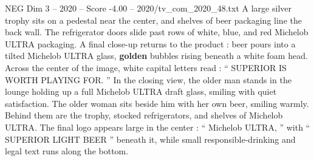 \begin{textsample}{NEG Dim 3 – 2020 – Score -4.00 – 2020/tv\_com\_2020\_48.txt}
A large silver trophy sits on a pedestal near the center, and shelves of beer packaging line the back wall.
The refrigerator doors slide past rows of white, blue, and red Michelob ULTRA packaging.
A final close-up returns to the product : beer pours into a tilted Michelob ULTRA glass, \textbf{golden} bubbles rising beneath a white foam head.
Across the center of the image, white capital letters read : “ SUPERIOR IS WORTH PLAYING FOR. ” In the closing view, the older man stands in the lounge holding up a full Michelob ULTRA draft glass, smiling with quiet satisfaction.
The older woman sits beside him with her own beer, smiling warmly.
Behind them are the trophy, stocked refrigerators, and shelves of Michelob ULTRA.
The final logo appears large in the center : “ Michelob ULTRA, ” with “ SUPERIOR LIGHT BEER ” beneath it, while small responsible-drinking and legal text runs along the bottom.

\end{textsample}
